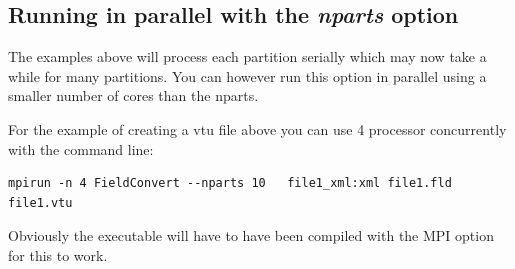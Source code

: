 \subsection{Running in parallel with the \textit{ nparts} option}

The examples above will process each partition serially which may now
take a while for many partitions. You can however run this option in
parallel using a smaller number of cores than the nparts.

For the example of creating a vtu file above you can use 4 processor
concurrently with the command line:
\begin{lstlisting}[style=BashInputStyle]
mpirun -n 4 FieldConvert --nparts 10   file1_xml:xml file1.fld file1.vtu
\end{lstlisting}

Obviously the executable will have to have been compiled with the MPI
option for this to work.


